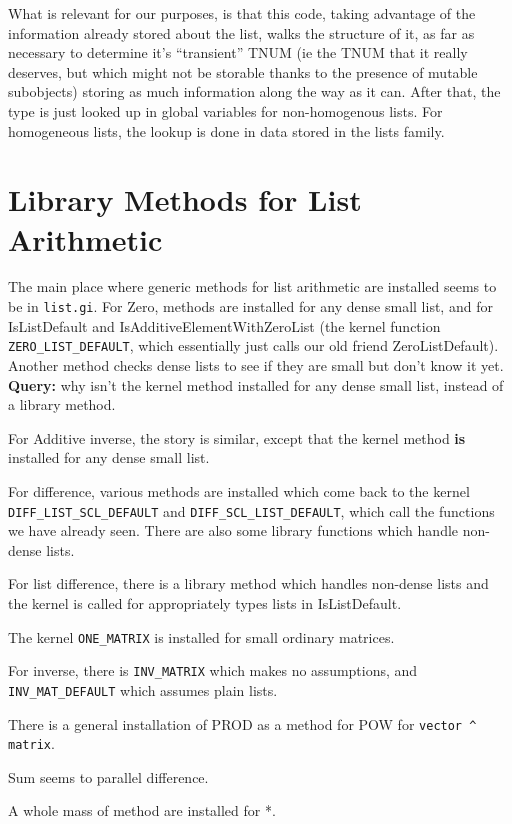 \documentclass{article}
\begin{document}
What is relevant for our purposes, is that this code, taking advantage
of the information already stored about the list, walks the structure
of it, as far as necessary to determine it's ``transient'' TNUM (ie
the TNUM that it really deserves, but which might not be storable
thanks to the presence of mutable subobjects) storing as much
information along the way as it can. After that, the type is just
looked up in global variables for non-homogenous lists. For
homogeneous lists, the lookup is done in data stored in the lists
family. 

\section{Library Methods for List Arithmetic}

The main place where generic methods for list arithmetic are installed
seems to be in \verb|list.gi|. For Zero, methods are installed for any
dense small list, and for IsListDefault and
IsAdditiveElementWithZeroList (the kernel function \verb|ZERO_LIST_DEFAULT|,
which essentially just calls our old friend ZeroListDefault). Another
method checks dense lists to see if they are small but don't know it
yet. \textbf{Query:} why isn't the kernel method installed for any
dense small list, instead of a library method.

For Additive inverse, the story is similar, except that the kernel
method \textbf{is} installed for any dense small list.


For difference, various methods are installed which come back to the
kernel \verb|DIFF_LIST_SCL_DEFAULT| and \verb|DIFF_SCL_LIST_DEFAULT|,
which call the functions we have already seen. There are also some
library functions which handle non-dense lists.

For list difference, there is a library method which handles non-dense
lists and the kernel is called for appropriately types lists in
IsListDefault.

The kernel \verb|ONE_MATRIX| is installed for small ordinary matrices.

For inverse, there is \verb|INV_MATRIX| which makes no assumptions,
and \verb|INV_MAT_DEFAULT| which assumes plain lists.

There is a general installation of PROD as a method for POW for 
\verb|vector ^ matrix|.

Sum seems to parallel difference. 

A whole mass of method are installed for *. 
\end{document}
